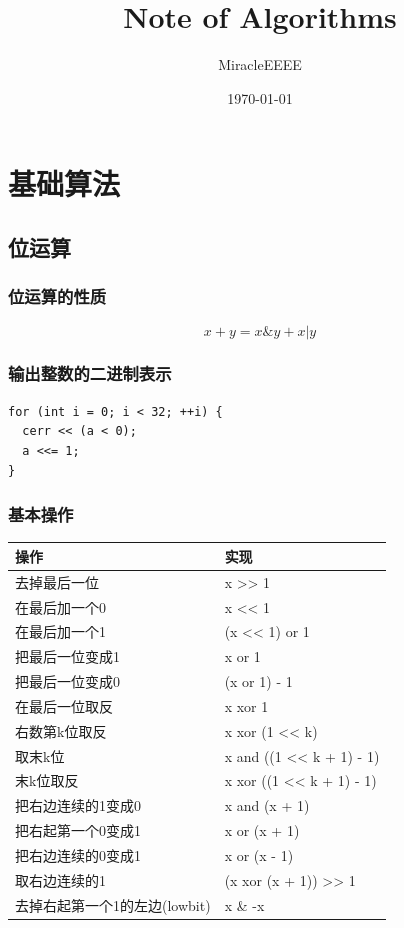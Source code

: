 \documentclass[11pt]{article}
\author{MiracleEEEE}
\date{\today}
\title{Note of Algorithms}
\begin{document}
\maketitle
\tableofcontents


\section{基础算法}
\label{sec-1}
\subsection{位运算}
\label{sec-1-1}
\subsubsection{位运算的性质}
\label{sec-1-1-1}

$$
x+y=x \& y + x | y
$$ 

\subsubsection{输出整数的二进制表示}
\label{sec-1-1-2}

\begin{verbatim}
for (int i = 0; i < 32; ++i) {
  cerr << (a < 0);
  a <<= 1;
}
\end{verbatim}

\subsubsection{基本操作}
\label{sec-1-1-3}

\begin{center}
\begin{tabular}{ll}
操作 & 实现\\
\hline
去掉最后一位 & x >> 1\\
在最后加一个0 & x << 1\\
在最后加一个1 & (x << 1) or 1\\
把最后一位变成1 & x or 1\\
把最后一位变成0 & (x or 1) - 1\\
在最后一位取反 & x xor 1\\
右数第k位取反 & x xor (1 << k)\\
取末k位 & x and ((1 << k + 1) - 1)\\
末k位取反 & x xor ((1 << k + 1) - 1)\\
把右边连续的1变成0 & x and (x + 1)\\
把右起第一个0变成1 & x or (x + 1)\\
把右边连续的0变成1 & x or (x - 1)\\
取右边连续的1 & (x xor (x + 1)) >> 1\\
去掉右起第一个1的左边(lowbit) & x \& -x\\
\end{tabular}
\end{center}
\end{document}
